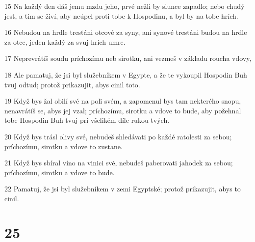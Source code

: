 \par 15 Na každý den dáš jemu mzdu jeho, prvé nežli by slunce zapadlo; nebo chudý jest, a tím se živí, aby neúpel proti tobe k Hospodinu, a byl by na tobe hrích.
\par 16 Nebudou na hrdle trestáni otcové za syny, ani synové trestáni budou na hrdle za otce, jeden každý za svuj hrích umre.
\par 17 Neprevrátíš soudu príchozímu neb sirotku, ani vezmeš v základu roucha vdovy,
\par 18 Ale pamatuj, že jsi byl služebníkem v Egypte, a že te vykoupil Hospodin Buh tvuj odtud; protož prikazujit, abys cinil toto.
\par 19 Když bys žal obilí své na poli svém, a zapomenul bys tam nekterého snopu, nenavrátíš se, abys jej vzal; príchozímu, sirotku a vdove to bude, aby požehnal tobe Hospodin Buh tvuj pri všelikém díle rukou tvých.
\par 20 Když bys trásl olivy své, nebudeš shledávati po každé ratolesti za sebou; príchozímu, sirotku a vdove to zustane.
\par 21 Když bys sbíral víno na vinici své, nebudeš paberovati jahodek za sebou; príchozímu, sirotku a vdove to bude.
\par 22 Pamatuj, že jsi byl služebníkem v zemi Egyptské; protož prikazujit, abys to cinil.

\chapter{25}

